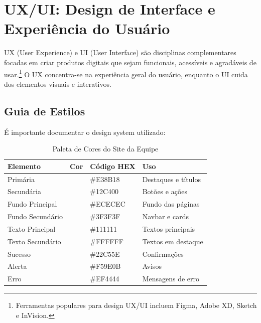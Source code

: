 \documentclass[11pt,a4paper]{article}
\begin{document}
\section{UX/UI: Design de Interface e Experiência do Usuário}

UX (User Experience) e UI (User Interface) \cite{silva2025} são disciplinas complementares focadas em criar produtos digitais que sejam funcionais, acessíveis e agradáveis de usar.\footnote{Ferramentas populares para design UX/UI incluem Figma, Adobe XD, Sketch e InVision.} O UX concentra-se na experiência geral do usuário, enquanto o UI cuida dos elementos visuais e interativos.


\subsection{Guia de Estilos}

É importante documentar o design system utilizado:

\begin{table}[H]
\centering
\caption{Paleta de Cores do Site da Equipe}
\label{tab:cores-equipe}

\begin{tabular}{|l|c|l|p{4cm}|}
\hline
\textbf{Elemento} & \textbf{Cor} & \textbf{Código HEX} & \textbf{Uso} \\
\hline

Primária & \colorbox[HTML]{E38B18}{\phantom{AAA}} & \#E38B18 & Destaques e títulos \\

Secundária & \colorbox[HTML]{12C400}{\phantom{AAA}} & \#12C400 & Botões e ações \\

Fundo Principal & \colorbox[HTML]{ECECEC}{\phantom{AAA}} & \#ECECEC & Fundo das páginas \\

Fundo Secundário & \colorbox[HTML]{3F3F3F}{\phantom{AAA}} & \#3F3F3F & Navbar e cards \\

Texto Principal & \colorbox[HTML]{111111}{\color{white}\phantom{AAA}} & \#111111 & Textos principais \\

Texto Secundário & \colorbox[HTML]{FFFFFF}{\color{black}\phantom{AAA}} & \#FFFFFF & Textos em destaque \\

Sucesso & \colorbox[HTML]{22C55E}{\phantom{AAA}} & \#22C55E & Confirmações \\

Alerta & \colorbox[HTML]{F59E0B}{\phantom{AAA}} & \#F59E0B & Avisos \\

Erro & \colorbox[HTML]{EF4444}{\color{white}\phantom{AAA}} & \#EF4444 & Mensagens de erro \\

\hline
\end{tabular}

\end{table}
\end{document}
